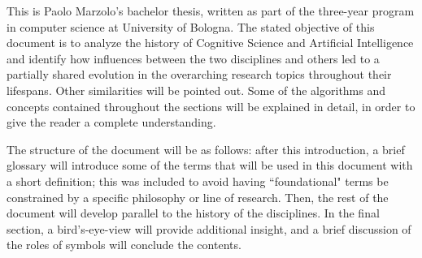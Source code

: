 \documentclass[../main.tex]{subfiles}
\begin{document}
This is Paolo Marzolo's bachelor thesis, written as part of the three-year program in computer science at University of Bologna. The stated objective of this document is to analyze the history of Cognitive Science and Artificial Intelligence and identify how influences between the two disciplines and others led to a partially shared evolution in the overarching research topics throughout their lifespans. Other similarities will be pointed out. Some of the algorithms and concepts contained throughout the sections will be explained in detail, in order to give the reader a complete understanding.

The structure of the document will be as follows: after this introduction, a brief glossary will introduce some of the terms that will be used in this document with a short definition; this was included to avoid having ``foundational" terms be constrained by a specific philosophy or line of research. Then, the rest of the document will develop parallel to the history of the disciplines. In the final section, a bird's-eye-view will provide additional insight, and a brief discussion of the roles of symbols will conclude the contents.
\end{document}
